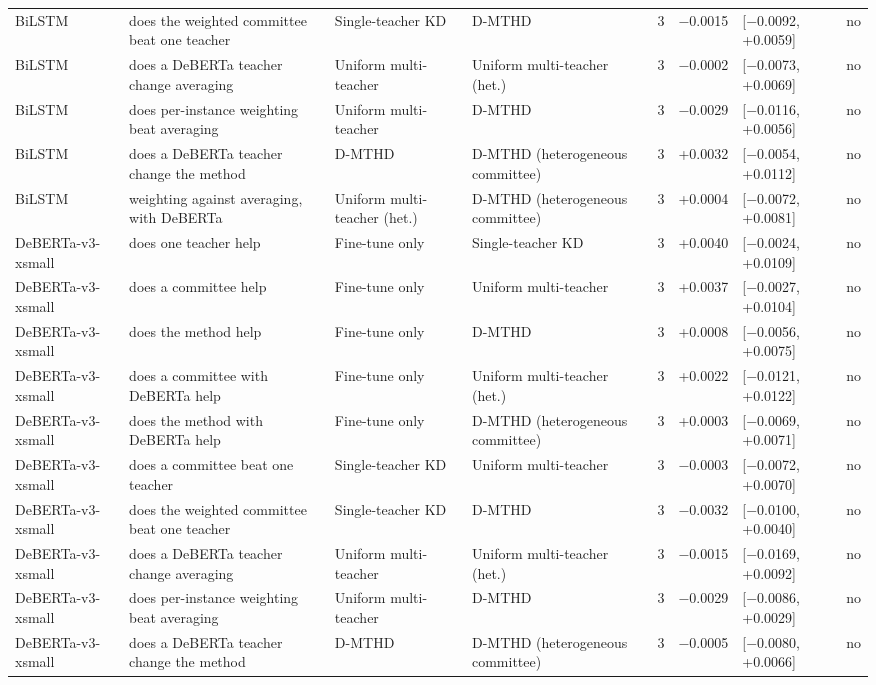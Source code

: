 {\begin{longtable}{p{1.5cm}p{2.9cm}p{2.5cm}p{2.6cm}cp{1.0cm}p{1.8cm}c}
BiLSTM & does the weighted committee beat one teacher & Single-teacher KD & D-MTHD & 3 & $-$0.0015 & [$-$0.0092, +0.0059] & no \\
BiLSTM & does a DeBERTa teacher change averaging & Uniform multi-teacher & Uniform multi-teacher (het.) & 3 & $-$0.0002 & [$-$0.0073, +0.0069] & no \\
BiLSTM & does per-instance weighting beat averaging & Uniform multi-teacher & D-MTHD & 3 & $-$0.0029 & [$-$0.0116, +0.0056] & no \\
BiLSTM & does a DeBERTa teacher change the method & D-MTHD & D-MTHD (heterogeneous committee) & 3 & +0.0032 & [$-$0.0054, +0.0112] & no \\
BiLSTM & weighting against averaging, with DeBERTa & Uniform multi-teacher (het.) & D-MTHD (heterogeneous committee) & 3 & +0.0004 & [$-$0.0072, +0.0081] & no \\
DeBERTa-v3-xsmall & does one teacher help & Fine-tune only & Single-teacher KD & 3 & +0.0040 & [$-$0.0024, +0.0109] & no \\
DeBERTa-v3-xsmall & does a committee help & Fine-tune only & Uniform multi-teacher & 3 & +0.0037 & [$-$0.0027, +0.0104] & no \\
DeBERTa-v3-xsmall & does the method help & Fine-tune only & D-MTHD & 3 & +0.0008 & [$-$0.0056, +0.0075] & no \\
DeBERTa-v3-xsmall & does a committee with DeBERTa help & Fine-tune only & Uniform multi-teacher (het.) & 3 & +0.0022 & [$-$0.0121, +0.0122] & no \\
DeBERTa-v3-xsmall & does the method with DeBERTa help & Fine-tune only & D-MTHD (heterogeneous committee) & 3 & +0.0003 & [$-$0.0069, +0.0071] & no \\
DeBERTa-v3-xsmall & does a committee beat one teacher & Single-teacher KD & Uniform multi-teacher & 3 & $-$0.0003 & [$-$0.0072, +0.0070] & no \\
DeBERTa-v3-xsmall & does the weighted committee beat one teacher & Single-teacher KD & D-MTHD & 3 & $-$0.0032 & [$-$0.0100, +0.0040] & no \\
DeBERTa-v3-xsmall & does a DeBERTa teacher change averaging & Uniform multi-teacher & Uniform multi-teacher (het.) & 3 & $-$0.0015 & [$-$0.0169, +0.0092] & no \\
DeBERTa-v3-xsmall & does per-instance weighting beat averaging & Uniform multi-teacher & D-MTHD & 3 & $-$0.0029 & [$-$0.0086, +0.0029] & no \\
DeBERTa-v3-xsmall & does a DeBERTa teacher change the method & D-MTHD & D-MTHD (heterogeneous committee) & 3 & $-$0.0005 & [$-$0.0080, +0.0066] & no \\

\end{longtable}}
